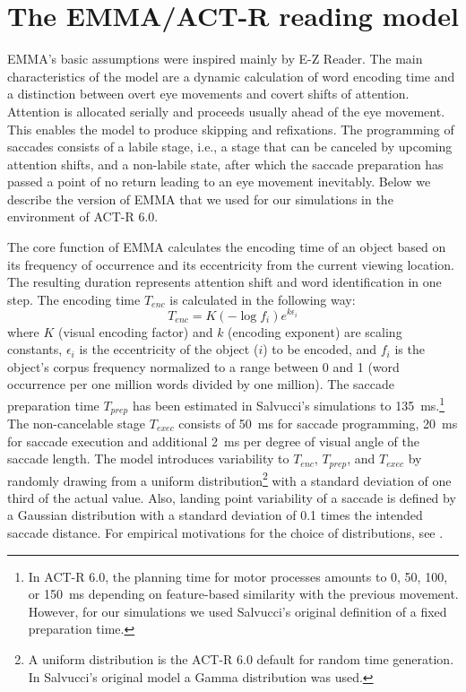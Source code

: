 \section{The EMMA/ACT-R reading model}
EMMA's basic assumptions were inspired mainly by E-Z Reader. The main characteristics of the model are a dynamic calculation of word encoding time and a distinction between overt eye movements and covert shifts of attention. Attention is allocated serially and proceeds usually ahead of the eye movement. This enables the model to produce skipping and refixations. The programming of saccades consists of a labile stage, i.e., a stage that can be canceled by upcoming attention shifts, and a non-labile state, after which the saccade preparation has passed a point of no return leading to an eye movement inevitably. Below we describe the version of EMMA that we used for our simulations in the environment of ACT-R 6.0.

The core function of EMMA calculates the encoding time of an object based on its frequency of occurrence and its eccentricity from the current viewing location. The resulting duration represents attention shift and word identification in one step. The encoding time $T_{enc}$ is calculated in the following way:
\begin{equation}
T_{enc} = K (- \log{f_i}) e^{k\epsilon_i}
\end{equation}
where $K$ (visual encoding factor) and $k$ (encoding exponent) are scaling constants, $\epsilon_i$ is the eccentricity of the object ($i$) to be encoded, and $f_i$ is the object's corpus frequency normalized to a range between 0 and 1 (word occurrence per one million words divided by one million). The saccade preparation time $T_{prep}$ has been estimated in Salvucci's simulations to 135~ms.\footnote{In ACT-R 6.0, the planning time for motor processes amounts to 0, 50, 100, or 150~ms depending on feature-based similarity with the previous movement. However, for our simulations we used Salvucci's original definition of a fixed preparation time.} The non-cancelable stage $T_{exec}$ consists of 50~ms for saccade programming, 20~ms for saccade execution and additional 2~ms per degree of visual angle of the saccade length. The model introduces variability to $T_{enc}$, $T_{prep}$, and $T_{exec}$ by randomly drawing from a uniform distribution\footnote{A uniform distribution is the ACT-R 6.0 default for random time generation. In Salvucci's original model a Gamma distribution was used.} with a standard deviation of one third of the actual value. Also, landing point variability of a saccade is defined by a Gaussian distribution with a standard deviation of 0.1 times the intended saccade distance. For empirical motivations for the choice of distributions, see \cite{Salvucci2001}.

